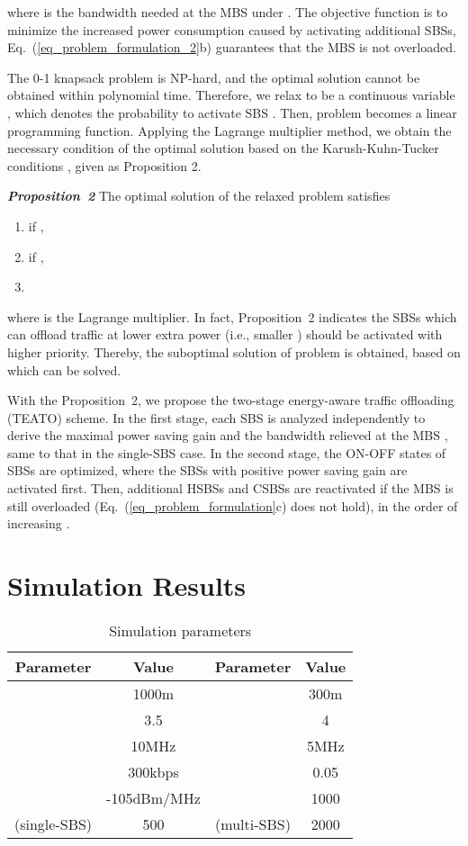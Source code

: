 \documentclass[12pt, draftclsnofoot,onecolumn]{IEEEtran}
\begin{document}
where  is the bandwidth needed at the MBS under .
The objective function is to minimize the increased power consumption caused by activating additional SBSs, Eq.~(\ref{eq_problem_formulation_2}b) guarantees that the MBS is not overloaded.

The 0-1 knapsack problem is NP-hard, and the optimal solution cannot be obtained within polynomial time.
Therefore, we relax  to be a continuous variable , which denotes the probability to activate SBS .
Then, problem  becomes a linear programming function.
Applying the Lagrange multiplier method, we obtain the necessary condition of the optimal solution based on the Karush-Kuhn-Tucker conditions \cite{convex_optimization}, given as Proposition 2.

\emph{\textbf{Proposition~2}} The optimal solution of the relaxed problem  satisfies
\begin{enumerate}
  \item  if ,
  \item  if ,
  \item 
\end{enumerate}
where  is the Lagrange multiplier.
In fact, Proposition~2 indicates the SBSs which can offload traffic at lower extra power (i.e., smaller ) should be activated with higher priority.
Thereby, the suboptimal solution of problem  is obtained, based on which  can be solved.

With the Proposition~2, we propose the two-stage energy-aware traffic offloading (TEATO) scheme.
In the first stage, each SBS is analyzed independently to derive the maximal power saving gain  and the bandwidth relieved at the MBS , same to that in the single-SBS case.
In the second stage, the ON-OFF states of SBSs are optimized, where the SBSs with positive power saving gain are activated first.
Then, additional HSBSs and CSBSs are reactivated if the MBS is still overloaded (Eq.~(\ref{eq_problem_formulation}c) does not hold), in the order of increasing . \section{Simulation Results}
    \label{sec_numerical_results}
    \begin{table}[!t]
        \caption{Simulation parameters}
        \label{tab_parameter}
        \centering
        \begin{tabular}{cc||cc}
        \hline
        \hline
        Parameter & Value & Parameter & Value \\
        \hline
         & 1000m &  & 300m \\
         & 3.5 &  & 4 \\
         & 10MHz &  & 5MHz\\
         & 300kbps &  & 0.05\\
         & -105dBm/MHz &  & 1000\\
         (single-SBS) & 500 &  (multi-SBS) & 2000\\
        \hline
        \hline
        \end{tabular}
\end{table}
\end{document}
